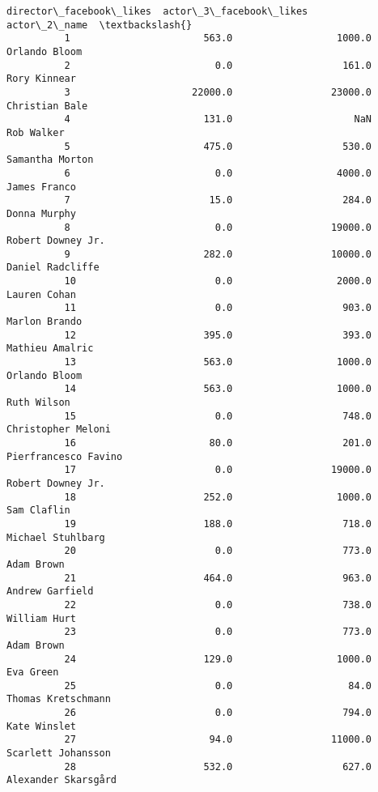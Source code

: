 \documentclass[11pt]{article}
\begin{document}
\begin{Verbatim}[commandchars=\\\{\}]
                director\_facebook\_likes  actor\_3\_facebook\_likes          actor\_2\_name  \textbackslash{}
          1                       563.0                  1000.0         Orlando Bloom   
          2                         0.0                   161.0          Rory Kinnear   
          3                     22000.0                 23000.0        Christian Bale   
          4                       131.0                     NaN            Rob Walker   
          5                       475.0                   530.0       Samantha Morton   
          6                         0.0                  4000.0          James Franco   
          7                        15.0                   284.0          Donna Murphy   
          8                         0.0                 19000.0     Robert Downey Jr.   
          9                       282.0                 10000.0      Daniel Radcliffe   
          10                        0.0                  2000.0          Lauren Cohan   
          11                        0.0                   903.0         Marlon Brando   
          12                      395.0                   393.0       Mathieu Amalric   
          13                      563.0                  1000.0         Orlando Bloom   
          14                      563.0                  1000.0           Ruth Wilson   
          15                        0.0                   748.0    Christopher Meloni   
          16                       80.0                   201.0  Pierfrancesco Favino   
          17                        0.0                 19000.0     Robert Downey Jr.   
          18                      252.0                  1000.0           Sam Claflin   
          19                      188.0                   718.0     Michael Stuhlbarg   
          20                        0.0                   773.0            Adam Brown   
          21                      464.0                   963.0       Andrew Garfield   
          22                        0.0                   738.0          William Hurt   
          23                        0.0                   773.0            Adam Brown   
          24                      129.0                  1000.0             Eva Green   
          25                        0.0                    84.0    Thomas Kretschmann   
          26                        0.0                   794.0          Kate Winslet   
          27                       94.0                 11000.0    Scarlett Johansson   
          28                      532.0                   627.0   Alexander Skarsgård   

\end{Verbatim}
\end{document}
